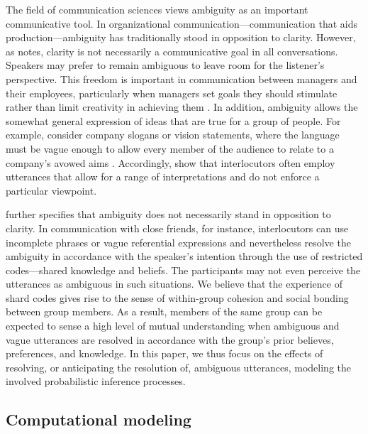 \documentclass[10pt,a4paper]{article}
\newcommand{\gcs}[1]{\textcolor{blue}{[gcs: #1]}}
\begin{document}
The field of communication sciences views ambiguity as an important communicative tool. %
In organizational communication---communication that aids production---ambiguity has traditionally stood in opposition to clarity. However, as  notes, clarity is not necessarily a communicative goal in all conversations. Speakers may prefer to remain ambiguous to leave room for the listener's perspective. This freedom is important in communication between managers and their employees, particularly when managers set goals they should stimulate rather than limit creativity in achieving them \cite{mohr1983implications}.
In addition, ambiguity allows the somewhat general expression of ideas that are true for a group of people. 
For example, consider company slogans or vision statements, where the language must be vague enough to allow every member of the audience to relate to a company's avowed aims \cite{carmon2013}. 
Accordingly,  show that interlocutors often employ utterances that allow for a range of interpretations and do not enforce a particular viewpoint.

 further specifies that ambiguity does not necessarily stand in opposition to clarity. In communication with close friends, for instance, interlocutors can use incomplete phrases or vague referential expressions and nevertheless resolve the ambiguity in accordance with the speaker's intention through the use of restricted codes---shared knowledge and beliefs. The participants may not even perceive the utterances as ambiguous in such situations. We believe that the experience of shard codes gives rise to the sense of within-group cohesion and social bonding between group members.
As a result, members of the same group can be expected to sense a high level of mutual understanding when ambiguous and vague utterances are resolved in accordance with the group's prior believes, preferences, and knowledge.
In this paper, we thus focus on the effects of resolving, or anticipating the resolution of, ambiguous utterances, modeling the involved probabilistic inference processes. 



\subsection{Computational modeling}
\end{document}
